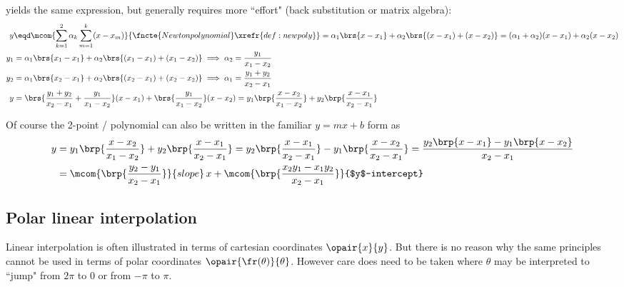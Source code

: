   yields the same expression, 
but generally requires more ``effort" (back substitution or matrix algebra):
\begin{align*}
  y   &\eqd%
        \mcom{\sum_{k=1}^2\alpha_k\sum_{m=1}^k(x-x_m)}{\fncte{Newton polynomial} \xrefr{def:newpoly}}
          = \alpha_1\brs{x-x_1} + \alpha_2\brs{(x-x_1)+(x-x_2)}
          = (\alpha_1+\alpha_2)(x-x_1) + \alpha_2(x-x_2)
    \\
  y_1 &= \alpha_1\brs{x_1-x_1} + \alpha_2\brs{(x_1-x_1)+(x_1-x_2)}
       \implies \alpha_2 = \frac{y_1}{x_1-x_2}
    \\
  y_2 &= \alpha_1\brs{x_2-x_1} + \alpha_2\brs{(x_2-x_1)+(x_2-x_2)}
       \implies \alpha_1 = \frac{y_1+y_2}{x_2-x_1}
    \\
  y   &= %
           \brs{\frac{y_1+y_2}{x_2-x_1}+\frac{y_1}{x_1-x_2}}(x-x_1) + \brs{\frac{y_1}{x_1-x_2}}(x-x_2)
           = y_1\brp{\frac{x-x_2}{x_1-x_2}} + y_2\brp{\frac{x-x_1}{x_2-x_1}} 
\end{align*}

Of course the 2-point / polynomial can 
also be written in the familiar  $y=mx+b$ form as
\begin{align*}
  y   
    &= y_1\brp{\frac{x-x_2}{x_1-x_2}} + y_2\brp{\frac{x-x_1}{x_2-x_1}} 
     = y_2\brp{\frac{x-x_1}{x_2-x_1}} - y_1\brp{\frac{x-x_2}{x_2-x_1}} 
     = \frac{y_2\brp{x-x_1} - y_1\brp{x-x_2}}{x_2-x_1}
  \\&= \mcom{\brp{\frac{y_2-y_1}{x_2-x_1}}}{slope}\,x + \mcom{\brp{\frac{x_2y_1-x_1y_2}{x_2-x_1}}}{$y$-intercept}
\end{align*}

\subsection{Polar linear interpolation}
Linear interpolation is often illustrated in terms of cartesian coordinates $\opair{x}{y}$.
But there is no reason why the same principles cannot be used in terms of polar coordinates $\opair{\fr(\theta)}{\theta}$.
However care does need to be taken where $\theta$ may be interpreted to ``jump" from $2\pi$ to $0$ 
or from $-\pi$ to $\pi$.

